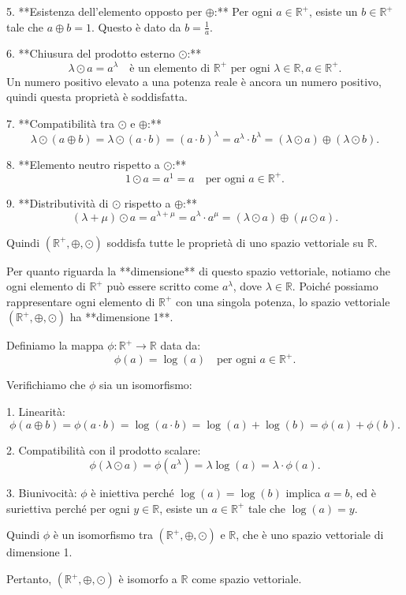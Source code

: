	5. **Esistenza dell'elemento opposto per \(\oplus\):**
	Per ogni \(a \in \mathbb{R}^+\), esiste un \(b \in \mathbb{R}^+\) tale che \(a \oplus b = 1\). Questo è dato da \(b = \frac{1}{a}\).
	
	6. **Chiusura del prodotto esterno \(\odot\):**
	\[
	\lambda \odot a = a^\lambda \quad \text{è un elemento di } \mathbb{R}^+ \text{ per ogni } \lambda \in \mathbb{R}, a \in \mathbb{R}^+.
	\]
	Un numero positivo elevato a una potenza reale è ancora un numero positivo, quindi questa proprietà è soddisfatta.
	
	7. **Compatibilità tra \(\odot\) e \(\oplus\):**
	\[
	\lambda \odot (a \oplus b) = \lambda \odot (a \cdot b) = (a \cdot b)^\lambda = a^\lambda \cdot b^\lambda = (\lambda \odot a) \oplus (\lambda \odot b).
	\]
	
	8. **Elemento neutro rispetto a \(\odot\):**
	\[
	1 \odot a = a^1 = a \quad \text{per ogni } a \in \mathbb{R}^+.
	\]
	
	9. **Distributività di \(\odot\) rispetto a \(\oplus\):**
	\[
	(\lambda + \mu) \odot a = a^{\lambda + \mu} = a^\lambda \cdot a^\mu = (\lambda \odot a) \oplus (\mu \odot a).
	\]
	
	Quindi \((\mathbb{R}^+, \oplus, \odot)\) soddisfa tutte le proprietà di uno spazio vettoriale su \(\mathbb{R}\).
	
	Per quanto riguarda la **dimensione** di questo spazio vettoriale, notiamo che ogni elemento di \(\mathbb{R}^+\) può essere scritto come \(a^\lambda\), dove \(\lambda \in \mathbb{R}\). Poiché possiamo rappresentare ogni elemento di \(\mathbb{R}^+\) con una singola potenza, lo spazio vettoriale \((\mathbb{R}^+, \oplus, \odot)\) ha **dimensione 1**.
	
	
	
	Definiamo la mappa \(\phi: \mathbb{R}^+ \to \mathbb{R}\) data da:
	\[
	\phi(a) = \log(a) \quad \text{per ogni } a \in \mathbb{R}^+.
	\]
	
	Verifichiamo che \(\phi\) sia un isomorfismo:
	
	1. Linearità:
	\[
	\phi(a \oplus b) = \phi(a \cdot b) = \log(a \cdot b) = \log(a) + \log(b) = \phi(a) + \phi(b).
	\]
	
	2. Compatibilità con il prodotto scalare:
	\[
	\phi(\lambda \odot a) = \phi(a^\lambda) = \lambda \log(a) = \lambda \cdot \phi(a).
	\]

	3. Biunivocità:
	\(\phi\) è iniettiva perché \(\log(a) = \log(b)\) implica \(a = b\), ed è suriettiva perché per ogni \(y \in \mathbb{R}\), esiste un \(a \in \mathbb{R}^+\) tale che \(\log(a) = y\).
	
	Quindi \(\phi\) è un isomorfismo tra \((\mathbb{R}^+, \oplus, \odot)\) e \(\mathbb{R}\), che è uno spazio vettoriale di dimensione 1.
	
	Pertanto, \((\mathbb{R}^+, \oplus, \odot)\) è isomorfo a \(\mathbb{R}\) come spazio vettoriale.
	

